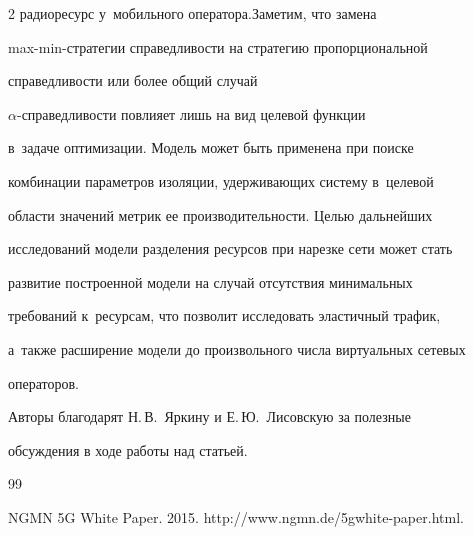 \begin{multicols}{2}
радиоресурс у~мобильного оператора.\linebreak Заметим, что замена  


max-min-стра\-те\-гии справедливости на стратегию пропорциональной 


справедливости или более общий случай  


$\alpha$-спра\-вед\-ли\-вости повлияет лишь на вид целевой функции 


в~задаче оптимизации. Модель может быть применена при поиске 


комбинации па\-ра\-мет\-ров изоляции, удерживающих сис\-те\-му в~целевой  


об\-ласти значений мет\-рик ее производительности. Целью дальнейших 


исследований модели разделения ресурсов при нарезке сети может стать 


развитие построенной модели на случай отсутствия минимальных 


требований к~ресурсам, что позволит исследовать элас\-тич\-ный трафик, 


а~также расширение модели до произвольного чис\-ла виртуальных сетевых 


операторов.


{





}


  


  \bigskip


  


  Авторы благодарят Н.\,В.~Яркину и Е.\,Ю.~Лисовскую за полезные 


обсуждения в ходе работы над статьей.


  


{\small\frenchspacing


 {%




 \begin{thebibliography}{99}


\vspace*{3pt}







NGMN 5G White Paper. 2015. {\sf http://www.ngmn.de/\linebreak 5gwhite-paper.html}.






\end{thebibliography}}}
\end{multicols}

